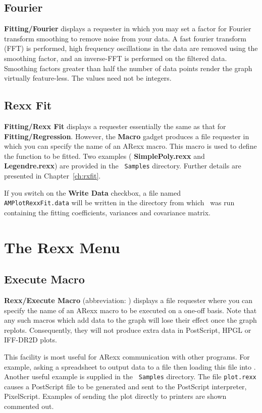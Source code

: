 \subsection{Fourier}
{\bf Fitting/Fourier}  
displays a requester in which you may set a 
factor for Fourier transform smoothing to remove noise from your data.
A fast fourier transform (FFT) is 
performed, high frequency oscillations in the data are removed using the smoothing 
factor, and an inverse-FFT is performed on the filtered data.
Smoothing factors greater 
than half the number of data points render the graph virtually feature-less.
The values need not be integers.


\subsection{Rexx Fit}
{\bf Fitting/Rexx Fit}  displays a requester essentially the 
same as that for {\bf 
Fitting/Regression}. However, the {\bf Macro} gadget produces a file 
requester in which you can specify the name of an ARexx macro. This macro 
is used to define the function to be fitted. Two examples ({\bf 
SimplePoly.rexx} and {\bf Legendre.rexx}) are provided in the {\tt 
Samples} directory. Further details are presented in 
Chapter~\ref{ch:rxfit}.

If you switch on the {\bf Write Data} checkbox, a file named\\
{\tt AMPlotRexxFit.data} will be written in the directory from which \amplot\ 
was run containing the fitting coefficients, variances and covariance 
matrix.


\section{The Rexx Menu}

\subsection{Execute Macro}
{\bf Rexx/Execute Macro} (abbreviation: ) displays a file 
requester where you can specify the name 
of an ARexx macro to be executed on a one-off basis. Note that any such 
macros which add data to the graph will lose their effect once the graph 
replots. Consequently, they will not produce extra data in PostScript, 
HPGL or IFF-DR2D plots.

This facility is most useful for ARexx communication with other programs. 
For example, asking a spreadsheet to output data to a file then loading 
this file into \amplot. Another useful example is supplied in the {\tt 
Samples} directory. The file {\tt plot.rexx} causes a PostScript file to 
be generated and sent to the PostScript interpreter, PixelScript. Examples of 
sending the plot directly to printers are shown commented out.

